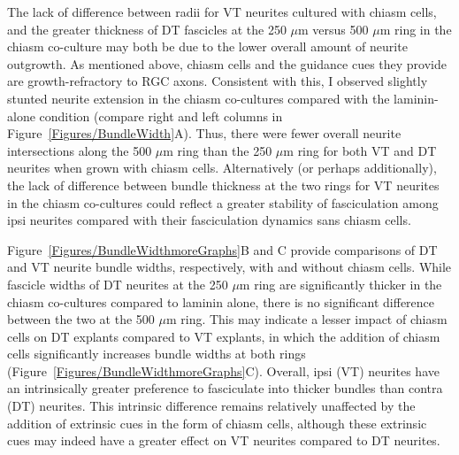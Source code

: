 The lack of difference between radii for VT neurites cultured with chiasm cells, and the greater thickness of DT fascicles at the 250 $\mu$m versus 500 $\mu$m ring in the chiasm co-culture may both be due to the lower overall amount of neurite outgrowth.
As mentioned above, chiasm cells and the guidance cues they provide are growth-refractory to RGC axons.
Consistent with this, I observed slightly stunted neurite extension in the chiasm co-cultures compared with the laminin-alone condition (compare right and left columns in Figure~\ref{Figures/BundleWidth}A).
Thus, there were fewer overall neurite intersections along the 500 $\mu$m ring than the 250 $\mu$m ring for both VT and DT neurites when grown with chiasm cells.
Alternatively (or perhaps additionally), the lack of difference between bundle thickness at the two rings for VT neurites in the chiasm co-cultures could reflect a greater stability of fasciculation among ipsi neurites compared with their fasciculation dynamics sans chiasm cells.

Figure~\ref{Figures/BundleWidthmoreGraphs}B and C provide comparisons of DT and VT neurite bundle widths, respectively, with and without chiasm cells.
While fascicle widths of DT neurites at the 250 $\mu$m ring are significantly thicker in the chiasm co-cultures compared to laminin alone, there is no significant difference between the two at the 500 $\mu$m ring.
This may indicate a lesser impact of chiasm cells on DT explants compared to VT explants, in which the addition of chiasm cells significantly increases bundle widths at both rings (Figure~\ref{Figures/BundleWidthmoreGraphs}C).
Overall, ipsi (VT) neurites have an intrinsically greater preference to fasciculate into thicker bundles than contra (DT) neurites.
This intrinsic difference remains relatively unaffected by the addition of extrinsic cues in the form of chiasm cells, although these extrinsic cues may indeed have a greater effect on VT neurites compared to DT neurites.